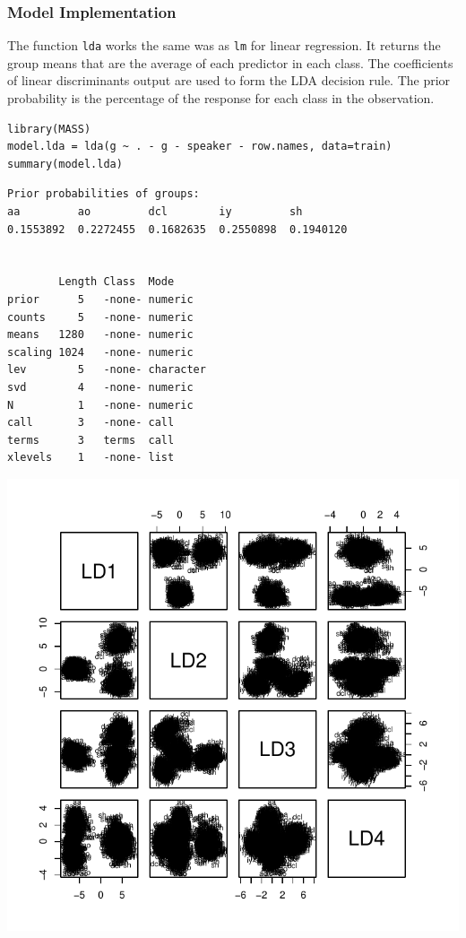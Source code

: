 \documentclass[]{report}
\begin{document}
\subsubsection{Model Implementation}
The function \texttt{lda} works the same was as \texttt{lm} for linear regression. It returns the group means that are the average of each predictor in each class. The coefficients of linear discriminants output are used to form the LDA decision rule. The prior probability is the percentage of the response for each class in the observation.

\begin{lstlisting}
library(MASS)
model.lda = lda(g ~ . - g - speaker - row.names, data=train)
summary(model.lda)
\end{lstlisting}

\begin{verbatim}
Prior probabilities of groups:
aa         ao         dcl        iy         sh 
0.1553892  0.2272455  0.1682635  0.2550898  0.1940120 


        Length Class  Mode     
prior      5   -none- numeric  
counts     5   -none- numeric  
means   1280   -none- numeric  
scaling 1024   -none- numeric  
lev        5   -none- character
svd        4   -none- numeric  
N          1   -none- numeric  
call       3   -none- call     
terms      3   terms  call     
xlevels    1   -none- list
\end{verbatim}

\begin{center}
	\includegraphics{Figures/model_lda_plot.pdf}
\end{center}
\end{document}
